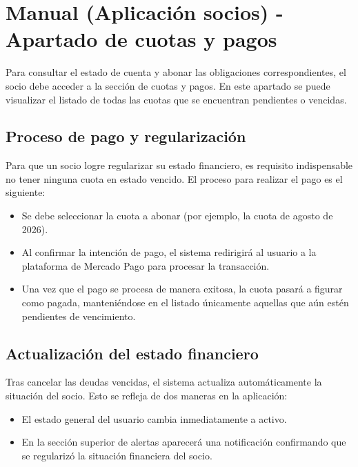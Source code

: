 \section{Manual (Aplicación socios) - Apartado de cuotas y pagos}

Para consultar el estado de cuenta y abonar las obligaciones correspondientes, el socio debe acceder a la sección de cuotas y pagos. En este apartado se puede visualizar el listado de todas las cuotas que se encuentran pendientes o vencidas.

\subsection{Proceso de pago y regularización}
Para que un socio logre regularizar su estado financiero, es requisito indispensable no tener ninguna cuota en estado vencido. El proceso para realizar el pago es el siguiente:

\begin{itemize}
    \item Se debe seleccionar la cuota a abonar (por ejemplo, la cuota de agosto de 2026).
    \item Al confirmar la intención de pago, el sistema redirigirá al usuario a la plataforma de Mercado Pago para procesar la transacción.
    \item Una vez que el pago se procesa de manera exitosa, la cuota pasará a figurar como pagada, manteniéndose en el listado únicamente aquellas que aún estén pendientes de vencimiento.
\end{itemize}

\subsection{Actualización del estado financiero}
Tras cancelar las deudas vencidas, el sistema actualiza automáticamente la situación del socio. Esto se refleja de dos maneras en la aplicación:
\begin{itemize}
    \item El estado general del usuario cambia inmediatamente a activo.
    \item En la sección superior de alertas aparecerá una notificación confirmando que se regularizó la situación financiera del socio.
\end{itemize}
